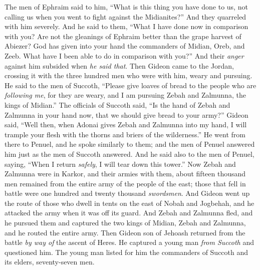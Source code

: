 \begin{biblechapter} %
 The men of Ephraim said to him, “What is this thing you have done to us, not calling us when you went to fight against the Midianites?” And they quarreled with him severely.
\verse And he said to them, “What I have done now in comparison with you? Are not the gleanings of Ephraim better than the grape harvest of Abiezer?
\verse God has given into your hand the commanders of Midian, Oreb, and Zeeb. What have I been able to do in comparison with you?” And their \textit{anger} against him subsided when \textit{he said that}.
\verse Then Gideon came to the Jordan, crossing it with the three hundred men who were with him, weary and pursuing.
\verse He said to the men of Succoth, “Please give loaves of bread to the people who are \textit{following me}, for they are weary, and I am pursuing Zebah and Zalmunna, the kings of Midian.”
\verse The officials of Succoth said, “Is the hand of Zebah and Zalmunna in your hand now, that we should give bread to your army?”
\verse Gideon said, “Well then, when Adonai gives Zebah and Zalmunna into my hand, I will trample your flesh with the thorns and briers of the wilderness.”
\verse He went from there to Penuel, and he spoke similarly to them; and the men of Penuel answered him just as the men of Succoth answered.
\verse And he said also to the men of Penuel, saying, “When I return \textit{safely}, I will tear down this tower.”
\verse Now Zebah and Zalmunna were in Karkor, and their armies with them, about fifteen thousand men remained from the entire army of the people of the east; those that fell in battle were one hundred and twenty thousand \textit{swordsmen}.
\verse And Gideon went up the route of those who dwell in tents on the east of Nobah and Jogbehah, and he attacked the army when it was off its guard.
\verse And Zebah and Zalmunna fled, and he pursued them and captured the two kings of Midian, Zebah and Zalmunna, and he routed the entire army.
\verse Then Gideon son of Jehoash returned from the battle \textit{by way of} the ascent of Heres.
\verse He captured a young man \textit{from Succoth} and questioned him. The young man listed for him the commanders of Succoth and its elders, seventy-seven men.

\end{biblechapter}
